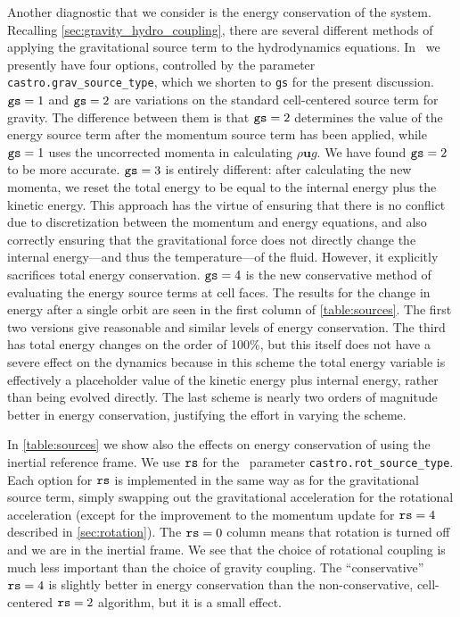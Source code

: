 \documentclass[12pt]{article}
\begin{document}
Another diagnostic that we consider is the energy conservation of the
system. Recalling \autoref{sec:gravity_hydro_coupling}, there are
several different methods of applying the gravitational source term to
the hydrodynamics equations. In \castro\ we presently have four
options, controlled by the parameter {\tt castro.grav\_source\_type},
which we shorten to {\tt gs} for the present discussion.
${\tt gs} = 1$ and ${\tt gs} = 2$ are variations on the standard
cell-centered source term for gravity. The difference between them is that
${\tt gs} = 2$ determines the value of the energy source term after the momentum
source term has been applied, while ${\tt gs} = 1$ uses the uncorrected
momenta in calculating $\rho \mathbf{u} g$. We have found ${\tt gs} = 2$ to be
more accurate. ${\tt gs} = 3$ is entirely different: after calculating
the new momenta, we reset the total energy to be equal to the internal
energy plus the kinetic energy. This approach has the virtue of ensuring that
there is no conflict due to discretization between the momentum and
energy equations, and also correctly ensuring that the gravitational
force does not directly change the internal energy---and thus the
temperature---of the fluid. However, it explicitly sacrifices total
energy conservation. ${\tt gs} = 4$ is the new conservative method of
evaluating the energy source terms at cell faces. The results for the
change in energy after a single orbit are seen in the first column of
\autoref{table:sources}. The first two versions give reasonable and
similar levels of energy conservation. The third has total energy
changes on the order of 100\%, but this itself does not have a severe
effect on the dynamics because in this scheme the total energy
variable is effectively a placeholder value of the kinetic energy plus
internal energy, rather than being evolved directly. The last scheme
is nearly two orders of magnitude better in energy conservation,
justifying the effort in varying the scheme.

In \autoref{table:sources} we show also the effects on energy conservation of using the inertial reference frame.
We use ${\tt rs}$ for the \castro\ parameter {\tt castro.rot\_source\_type}.
Each option for ${\tt rs}$ is implemented in the same way as for
the gravitational source term, simply swapping out the gravitational acceleration
for the rotational acceleration (except for the improvement to the momentum update
for ${\tt rs} = 4$ described in \autoref{sec:rotation}).
The ${\tt rs} = 0$ column means that rotation is turned off and we are
in the inertial frame. We see that the choice of rotational coupling is much less important than the choice of gravity coupling.
The ``conservative'' ${\tt rs} = 4$ is slightly better in energy conservation than the non-conservative,
cell-centered ${\tt rs} = 2$ algorithm, but it is a small effect.
\end{document}
